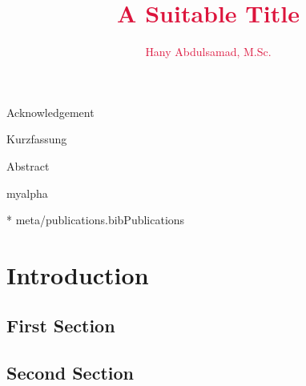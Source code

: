 \documentclass{iasthesis}
\newcommand{\filterminitoc}[1]{#1}
\newcommand{\minitocsection}{\begingroup\renewcommand{\filterminitoc}[1]{}\minitoc\endgroup}
\begin{document}
	
	\title{\textcolor{crimson} {A Suitable Title}}
	\author{\textcolor{crimson} {Hany Abdulsamad, M.Sc.}}
	
	\maketitle
	
	\begin{dedication}
		
	\end{dedication}

	
	
	\begin{meta}{Acknowledgement}
		
	\end{meta}

	\begin{meta}{Kurzfassung}
		\begin{otherlanguage}{ngerman}
			
		\end{otherlanguage}
	\end{meta}

	\begin{meta}{Abstract}
		
	\end{meta}



	{myalpha}

	\setlength{\bibitemsep}{.25\baselineskip plus .05\baselineskip minus .05\baselineskip}
	\nocite{pubs}{*}
	{meta/publications.bib}{Publications}


	\dominitoc[n]
	
	\tableofcontents
	\clearpage
	
	
		
	\chapter{Introduction}
	\minitocsection 
	\kant
	\section{First Section}
	\kant
	\section{Second Section}
	\kant
\end{document}
